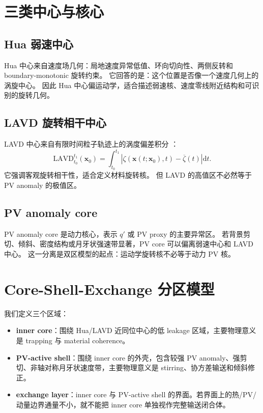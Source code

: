 \documentclass[UTF8,12pt]{ctexart}
\newcommand{\dd}{\mathrm{d}}
\begin{document}
\section{三类中心与核心}

\subsection{Hua 弱速中心}

Hua 中心来自速度场几何：局地速度异常低值、环向切向性、两侧反转和 boundary-monotonic 旋转约束。
它回答的是：这个位置是否像一个速度几何上的涡旋中心。
因此 Hua 中心偏运动学，适合描述弱速核、速度零线附近结构和可识别的旋转几何。

\subsection{LAVD 旋转相干中心}

LAVD 中心来自有限时间粒子轨迹上的涡度偏差积分 \cite{HallerEtAl2016}：
\begin{equation}
\mathrm{LAVD}_{t_0}^{t_1}(\bm{x}_0)
=
\int_{t_0}^{t_1}
\left|
\zeta(\bm{x}(t;\bm{x}_0),t)-\overline{\zeta}(t)
\right|
\dd t .
\end{equation}
它强调客观旋转相干性，适合定义材料旋转核。
但 LAVD 的高值区不必然等于 PV anomaly 的极值区。

\subsection{PV anomaly core}

PV anomaly core 是动力核心，表示 \(q'\) 或 PV proxy 的主要异常区。
若背景剪切、倾斜、密度结构或月牙状强速带显著，PV core 可以偏离弱速中心和 LAVD 中心。
这一分离是双区模型的起点：运动学旋转核不必等于动力 PV 核。

\section{Core-Shell-Exchange 分区模型}

我们定义三个区域：

\begin{itemize}
  \item \textbf{inner core}：围绕 Hua/LAVD 近同位中心的低 leakage 区域，主要物理意义是 trapping 与 material coherence。
  \item \textbf{PV-active shell}：围绕 inner core 的外壳，包含较强 PV anomaly、强剪切、非轴对称月牙状速度带，主要物理意义是 stirring、协方差输送和倾斜修正。
  \item \textbf{exchange layer}：inner core 与 PV-active shell 的界面。若界面上的热/PV/动量边界通量不小，就不能把 inner core 单独视作完整输送闭合体。
\end{itemize}
\end{document}

